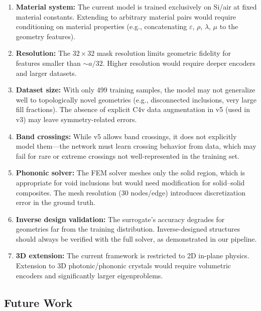 \documentclass[11pt]{article}
\begin{document}
\begin{enumerate}
    \item \textbf{Material system:} The current model is trained exclusively on Si/air at fixed material constants. Extending to arbitrary material pairs would require conditioning on material properties (e.g., concatenating $\varepsilon$, $\rho$, $\lambda$, $\mu$ to the geometry features).

    \item \textbf{Resolution:} The $32 \times 32$ mask resolution limits geometric fidelity for features smaller than $\sim a/32$. Higher resolution would require deeper encoders and larger datasets.

    \item \textbf{Dataset size:} With only 499 training samples, the model may not generalize well to topologically novel geometries (e.g., disconnected inclusions, very large fill fractions). The absence of explicit C4v data augmentation in v5 (used in v3) may leave symmetry-related errors.

    \item \textbf{Band crossings:} While v5 allows band crossings, it does not explicitly model them---the network must learn crossing behavior from data, which may fail for rare or extreme crossings not well-represented in the training set.

    \item \textbf{Phononic solver:} The FEM solver meshes only the solid region, which is appropriate for void inclusions but would need modification for solid--solid composites. The mesh resolution (30 nodes/edge) introduces discretization error in the ground truth.

    \item \textbf{Inverse design validation:} The surrogate's accuracy degrades for geometries far from the training distribution. Inverse-designed structures should always be verified with the full solver, as demonstrated in our pipeline.

    \item \textbf{3D extension:} The current framework is restricted to 2D in-plane physics. Extension to 3D photonic/phononic crystals would require volumetric encoders and significantly larger eigenproblems.
\end{enumerate}

\subsection{Future Work}
\end{document}
